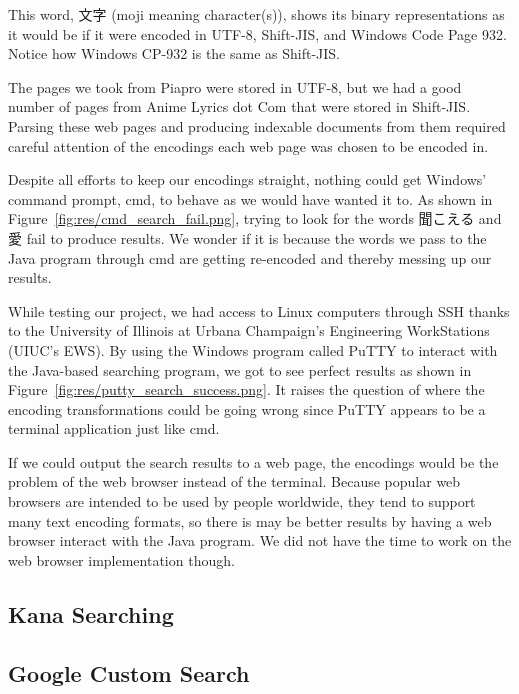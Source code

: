 \documentclass{acm} %
\begin{document}
\begin{CJK}{UTF8}{zhsong}
This word, 文字 (moji meaning character(s)), shows its binary representations as it would be if it were encoded in UTF-8, Shift-JIS, and Windows Code Page 932. Notice how Windows CP-932 is the same as Shift-JIS.

The pages we took from Piapro were stored in UTF-8, but we had a good number of pages from Anime Lyrics dot Com that were stored in Shift-JIS. Parsing these web pages and producing indexable documents from them required careful attention of the encodings each web page was chosen to be encoded in.

Despite all efforts to keep our encodings straight, nothing could get Windows' command prompt, cmd, to behave as we would have wanted it to. As shown in Figure~\ref{fig:res/cmd_search_fail.png}, trying to look for the words 聞こえる and 愛 fail to produce results. We wonder if it is because the words we pass to the Java program through cmd are getting re-encoded and thereby messing up our results.


While testing our project, we had access to Linux computers through SSH thanks to the University of Illinois at Urbana Champaign's Engineering WorkStations (UIUC's EWS). By using the Windows program called PuTTY to interact with the Java-based searching program, we got to see perfect results as shown in Figure~\ref{fig:res/putty_search_success.png}. It raises the question of where the encoding transformations could be going wrong since PuTTY appears to be a terminal application just like cmd.


If we could output the search results to a web page, the encodings would be the problem of the web browser instead of the terminal. Because popular web browsers are intended to be used by people worldwide, they tend to support many text encoding formats, so there is may be better results by having a web browser interact with the Java program. We did not have the time to work on the web browser implementation though.

\subsection{Kana Searching}

\subsection{Google Custom Search}


\end{CJK}
\end{document}
